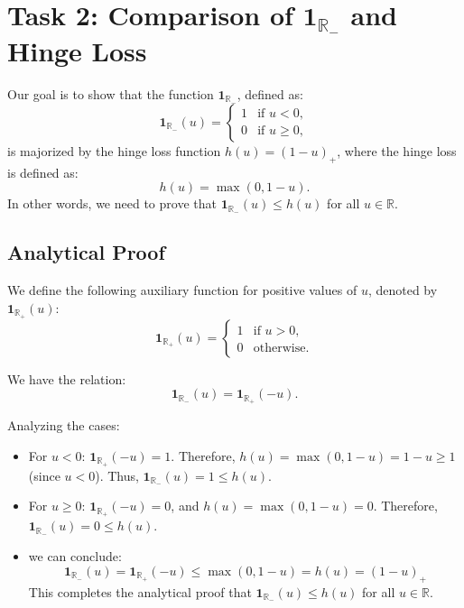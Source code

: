\documentclass[a4paper,12pt]{report}
\begin{document}
\section{Task 2: Comparison of $\mathbf{1}_{\mathbb{R}_-}$ and Hinge Loss}

Our goal is to show that the function \( \mathbf{1}_{\mathbb{R}_-} \), defined as:
\begin{equation} \label{eq:indicator}
\mathbf{1}_{\mathbb{R}_-}(u) = \begin{cases}
1 & \text{if } u < 0, \\
0 & \text{if } u \geq 0,
\end{cases}
\end{equation}
is majorized by the hinge loss function \( h(u) = (1 - u)_+ \), where the hinge loss is defined as:
\begin{equation} \label{eq:hinge_loss}
h(u) = \max(0, 1 - u).
\end{equation}
In other words, we need to prove that $\mathbf{1}_{\mathbb{R}_-}(u) \leq h(u)$ for all $u \in \mathbb{R}$.

\subsection{Analytical Proof}

We define the following auxiliary function for positive values of \( u \), denoted by \( \mathbf{1}_{\mathbb{R}_+}(u) \):
\begin{equation} \label{eq:indicator_positive}
\mathbf{1}_{\mathbb{R}_+}(u) = \begin{cases}
1 & \text{if } u > 0, \\
0 & \text{otherwise}.
\end{cases}
\end{equation}

We have the relation:
\begin{equation} \label{eq:relation}
\mathbf{1}_{\mathbb{R}_-}(u) = \mathbf{1}_{\mathbb{R}_+}(-u).
\end{equation}

Analyzing the cases:

\begin{itemize}
    \item For $u < 0$: $\mathbf{1}_{\mathbb{R}_+}(-u) = 1$. Therefore, $h(u) = \max(0, 1 - u) = 1 - u \geq 1$ (since $u < 0$). Thus, $\mathbf{1}_{\mathbb{R}_-}(u) = 1 \leq h(u)$.
    \item For $u \geq 0$: $\mathbf{1}_{\mathbb{R}_+}(-u) = 0$, and $h(u) = \max(0, 1 - u) = 0$. Therefore, $\mathbf{1}_{\mathbb{R}_-}(u) = 0 \leq h(u)$.
\item we can conclude:
\[
\mathbf{1}_{\mathbb{R}_-}(u) = \mathbf{1}_{\mathbb{R}_+}(-u) \leq \max(0, 1 - u) = h(u) = (1 - u)_+
\]
This completes the analytical proof that $\mathbf{1}_{\mathbb{R}_-}(u) \leq h(u)$ for all $u \in \mathbb{R}$.
\end{itemize}
\end{document}
